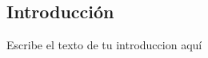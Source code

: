 \begin{multicols}{2}
    \begin{minipage}[t]{0.45\textwidth} %
        \tableofcontents
    \end{minipage}
    \hfill
    \begin{minipage}[t]{0.45\textwidth}
        \section{Introducción}
        Escribe el texto de tu introduccion aquí\\
        \lipsum[4]
    \end{minipage}
\end{multicols}